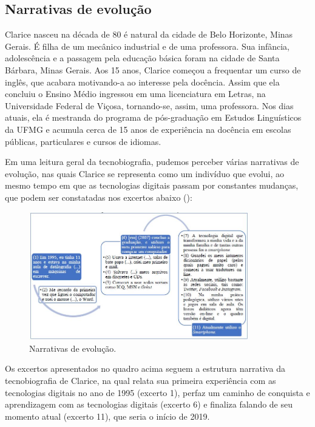 \documentclass{textolivre}
\begin{document}
\subsection{Narrativas de evolução}\label{sec-evolucao}
Clarice nasceu na década de 80 é natural da cidade de Belo Horizonte, Minas Gerais. É filha de um mecânico industrial e de uma professora. Sua infância, adolescência e a passagem pela educação básica foram na cidade de Santa Bárbara, Minas Gerais. Aos 15 anos, Clarice começou a frequentar um curso de inglês, que acabara motivando-a ao interesse pela docência. Assim que ela concluiu o Ensino Médio ingressou em uma licenciatura em Letras, na Universidade Federal de Viçosa, tornando-se, assim, uma professora. Nos dias atuais, ela é mestranda do programa de pós-graduação em Estudos Linguísticos da UFMG e acumula cerca de 15 anos de experiência na docência em escolas públicas, particulares e cursos de idiomas.

Em uma leitura geral da tecnobiografia, pudemos perceber várias narrativas de evolução, nas quais Clarice se representa como um indivíduo que evolui, ao mesmo tempo em que as tecnologias digitais passam por constantes mudanças, que podem ser constatadas nos excertos abaixo (): 

\begin{figure}[htbp]
 \centering
 \includegraphics[width=0.85\textwidth]{fig01.png}
 \caption{Narrativas de evolução.}
 \label{fig01}
\end{figure}

Os excertos apresentados no quadro acima seguem a estrutura narrativa da tecnobiografia de Clarice, na qual relata sua primeira experiência com as tecnologias digitais no ano de 1995 (excerto 1), perfaz um caminho de conquista e aprendizagem com as tecnologias digitais (excerto 6) e finaliza falando de seu momento atual (excerto 11), que seria o início de 2019.
\end{document}
